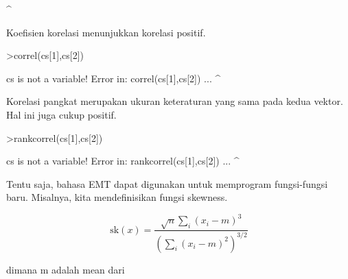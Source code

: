 \documentclass[a4paper,10pt]{article}
\begin{document}
\begin{eulernotebook}
\begin{eulercomment}
\begin{eulercomment}
\begin{eulercomment}
\begin{eulercomment}
\begin{eulercomment}
\begin{eulercomment}
\begin{eulercomment}
\begin{eulercomment}
\begin{eulercomment}
\begin{eulercomment}
\begin{eulercomment}
\begin{eulercomment}
\begin{eulercomment}
\begin{eulercomment}
\begin{eulercomment}
\begin{eulercomment}
\begin{eulercomment}
\begin{eulercomment}
\begin{eulercomment}
\begin{eulercomment}
\begin{eulercomment}
\begin{eulercomment}
\begin{eulercomment}
\begin{eulercomment}
\begin{eulercomment}
\begin{eulercomment}
\begin{eulercomment}
\begin{eulercomment}
\begin{eulercomment}
\begin{eulercomment}
\begin{eulercomment}
\begin{eulercomment}
\begin{eulercomment}
\begin{eulercomment}
\begin{eulercomment}
\begin{eulercomment}
\begin{eulercomment}
\begin{eulercomment}
\begin{eulercomment}
\begin{eulercomment}
\begin{eulercomment}
\begin{eulercomment}
\begin{eulercomment}
\begin{eulercomment}
\begin{eulercomment}
\begin{eulercomment}
\begin{eulercomment}
\begin{eulercomment}
\begin{eulercomment}
\begin{eulercomment}
\begin{eulercomment}
\begin{eulercomment}
\begin{eulercomment}
\begin{eulercomment}
\begin{eulercomment}
\begin{eulercomment}
\begin{eulercomment}
\begin{eulercomment}
\begin{eulercomment}
\begin{eulercomment}
\begin{eulercomment}
\begin{eulercomment}
\begin{eulercomment}
\begin{eulercomment}
\begin{eulercomment}
\begin{eulercomment}
\begin{euleroutput}
^
\end{euleroutput}
\begin{eulercomment}
Koefisien korelasi menunjukkan korelasi positif.
\end{eulercomment}
\begin{eulerprompt}
>correl(cs[1],cs[2])
\end{eulerprompt}
\begin{euleroutput}
  cs is not a variable!
  Error in:
  correl(cs[1],cs[2]) ...
              ^
\end{euleroutput}
\begin{eulercomment}
Korelasi pangkat merupakan ukuran keteraturan yang sama pada kedua
vektor. Hal ini juga cukup positif.
\end{eulercomment}
\begin{eulerprompt}
>rankcorrel(cs[1],cs[2])
\end{eulerprompt}
\begin{euleroutput}
  cs is not a variable!
  Error in:
  rankcorrel(cs[1],cs[2]) ...
                  ^
\end{euleroutput}
\begin{eulercomment}
Tentu saja, bahasa EMT dapat digunakan untuk memprogram fungsi-fungsi
baru. Misalnya, kita mendefinisikan fungsi skewness.

\end{eulercomment}
\begin{eulerformula}
\[
\text{sk}(x) = \dfrac{\sqrt{n} \sum_i (x_i-m)^3}{\left(\sum_i (x_i-m)^2\right)^{3/2 }}
\]
\end{eulerformula}
\begin{eulercomment}
dimana m adalah mean dari 
\end{eulercomment}
\end{eulercomment}
\end{eulercomment}
\end{eulercomment}
\end{eulercomment}
\end{eulercomment}
\end{eulercomment}
\end{eulercomment}
\end{eulercomment}
\end{eulercomment}
\end{eulercomment}
\end{eulercomment}
\end{eulercomment}
\end{eulercomment}
\end{eulercomment}
\end{eulercomment}
\end{eulercomment}
\end{eulercomment}
\end{eulercomment}
\end{eulercomment}
\end{eulercomment}
\end{eulercomment}
\end{eulercomment}
\end{eulercomment}
\end{eulercomment}
\end{eulercomment}
\end{eulercomment}
\end{eulercomment}
\end{eulercomment}
\end{eulercomment}
\end{eulercomment}
\end{eulercomment}
\end{eulercomment}
\end{eulercomment}
\end{eulercomment}
\end{eulercomment}
\end{eulercomment}
\end{eulercomment}
\end{eulercomment}
\end{eulercomment}
\end{eulercomment}
\end{eulercomment}
\end{eulercomment}
\end{eulercomment}
\end{eulercomment}
\end{eulercomment}
\end{eulercomment}
\end{eulercomment}
\end{eulercomment}
\end{eulercomment}
\end{eulercomment}
\end{eulercomment}
\end{eulercomment}
\end{eulercomment}
\end{eulercomment}
\end{eulercomment}
\end{eulercomment}
\end{eulercomment}
\end{eulercomment}
\end{eulercomment}
\end{eulercomment}
\end{eulercomment}
\end{eulercomment}
\end{eulercomment}
\end{eulercomment}
\end{eulercomment}
\end{eulercomment}
\end{eulernotebook}
\end{document}
